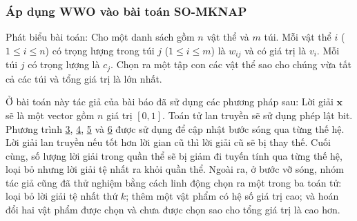 \begin{frame}
    \frametitle{Áp dụng WWO vào bài toán SO-MKNAP}
    \begin{block}{Phát biểu bài toán:}
        Cho một danh sách gồm $n$ vật thể và $m$ túi. Mỗi vật thể $i$ ($1 \le i \le n$) có trọng lượng trong túi $j$ ($1 \le i \le m$) là $w_{ij}$ và có giá trị là $v_i$. Mỗi túi $j$ có trọng lượng là $c_j$. Chọn ra một tập con các vật thể sao cho chúng vừa tất cả các túi và tổng giá trị là lớn nhất.
    \end{block}
    Ở bài toán này tác giả của bài báo đã sử dụng các phương pháp sau: Lời giải $\mathbf{x}$ sẽ là một vector gồm $n$ giá trị $[0, 1]$. Toán tử lan truyền sẽ sử dụng phép lật bit. Phương trình \hyperlink{eq:e3}{3}, \hyperlink{eq:e4}{4},  \hyperlink{eq:e5}{5} và \hyperlink{eq:e6}{6} được sử dụng để cập nhật bước sóng qua từng thế hệ. Lời giải lan truyền nếu tốt hơn lời gian cũ thì lời giải cũ sẽ bị thay thế. Cuối cùng, số lượng lời giải trong quần thể sẽ bị giảm đi tuyến tính qua từng thế hệ, loại bỏ nhưng lời giải tệ nhất ra khỏi quần thể. Ngoài ra, ở bước vỡ sóng, nhóm tác giả cũng đã thử nghiệm bằng cách linh động chọn ra một trong ba toán tử: loại bỏ lời giải tệ nhất thứ $k$; thêm một vật phẩm có hệ số giá trị cao; và hoán đổi hai vật phẩm được chọn và chưa được chọn sao cho tổng giá trị là cao hơn.
\end{frame}


